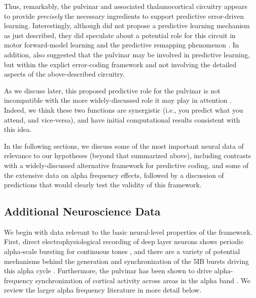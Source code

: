 \documentclass[11pt,twoside]{article}
\newif\myifpdf
\begin{document}
Thus, remarkably, the pulvinar and associated thalamocortical circuitry appears to provide \emph{precisely} the necessary ingredients to support predictive error-driven learning.  Interestingly, although \citet{ShermanGuillery06} did not propose a predictive learning mechanism as just described, they did speculate about a potential role for this circuit in motor forward-model learning and the predictive remapping phenomenon \citep{ShermanGuillery11,UsreySherman18}.  In addition, \citet{PennartzDoraMuckliEtAl19} also suggested that the pulvinar may be involved in predictive learning, but within the explict error-coding framework and not involving the detailed aspects of the above-described circuitry.

As we discuss later, this proposed predictive role for the pulvinar is not incompatible with the more widely-discussed role it may play in attention \citep{LaBergeBuchsbaum90,BenderYouakim01,SnowAllenRafalEtAl09,SaalmannKastner11,ZhouSchaferDesimone16,FiebelkornKastner19}.  Indeed, we think these two functions are synergistic (i.e., you predict what you attend, and vice-versa), and have initial computational results consistent with this idea.

In the following sections, we discuss some of the most important neural data of relevance to our hypotheses (beyond that summarized above), including contrasts with a widely-discussed alternative framework for predictive coding,  and some of the extensive data on alpha frequency effects, followed by a discussion of predictions that would clearly test the validity of this framework.

\subsection{Additional Neuroscience Data}

We begin with data relevant to the basic neural-level properties of the framework.  First, direct electrophysiological recording of deep layer neurons shows periodic alpha-scale bursting for continuous tones \citep{LuczakBarthoHarris13}, and there are a variety of potential mechanisms behind the generation and synchronization of the 5IB bursts driving this alpha cycle \citep{ConnorsGutnickPrince82,SilvaAmitaiConnors91,FranceschettiGuatteoPanzicaEtAl95}.  Furthermore, the pulvinar has been shown to drive alpha-frequency synchronization of cortical activity across areas in the alpha band \citep{SaalmannPinskWangEtAl12}.  We review the larger alpha frequency literature in more detail below.
\end{document}
